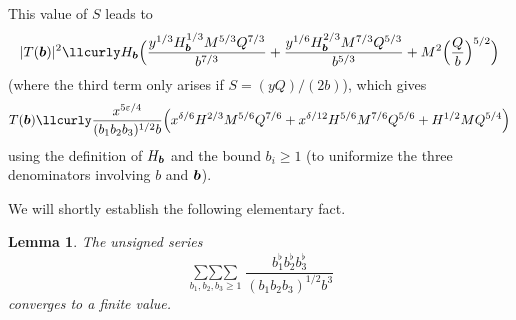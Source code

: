 \documentclass[12pt,a4paper,reqno]{amsart}
\numberwithin{equation}{section}
\theoremstyle{plain}
\newtheorem{lemma}[theorem]{Lemma}
\theoremstyle{definition}
\newcommand\eps{\varepsilon}
\newcommand{\uple}[1]{\text{\boldmath${#1}$}}
\newcommand\trpsum{\mathop{\sum\sum\sum}\limits}
\renewcommand{\lessapprox}{\llcurly}
\begin{document}
This value of $S$ leads to
$$
|T(\uple{b})|^2\lessapprox H_{\uple{b}}\Bigl(
\frac{y^{1/3}H_{\uple{b}}^{1/3}M^{5/3}Q^{7/3}}{b^{7/3}}
+\frac{y^{1/6}H_{\uple{b}}^{2/3}M^{7/3}Q^{5/3}}{b^{5/3}}
+M^2\Bigl(\frac{Q}{b}\Bigr)^{5/2}
\Bigr)
$$
(where the third term only arises if $S=(yQ)/(2b)$), which gives
$$
T(\uple{b})\lessapprox \frac{x^{5\eps/4}}{(b_1b_2b_3)^{1/2}b}
\Bigl(
x^{\delta/6}H^{2/3}M^{5/6}Q^{7/6}+
x^{\delta/12}H^{5/6}M^{7/6}Q^{5/6}+
H^{1/2}MQ^{5/4}
\Bigr)
$$
using the definition of $H_{\uple{b}}$ and the bound $b_i \ge 1$
(to uniformize the three denominators involving $b$ and $\uple{b}$).
\par
We will shortly establish the following elementary fact.

\begin{lemma}\label{lm-euler}
The unsigned series
$$
\trpsum_{b_1,b_2,b_3\geq
  1}\frac{b_1^{\flat}b_2^{\flat}b_3^{\flat}}{(b_1b_2b_3)^{1/2}b^3}
$$
converges to a finite value.
\end{lemma}
\end{document}

